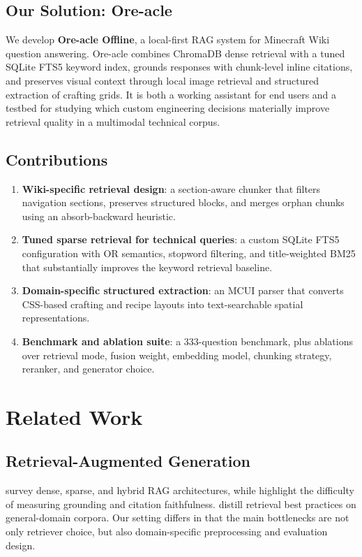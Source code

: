 \documentclass[11pt,a4paper]{article}
\begin{document}
\subsection{Our Solution: Ore-acle}
We develop \textbf{Ore-acle Offline}, a local-first RAG system for Minecraft Wiki question answering. Ore-acle combines ChromaDB dense retrieval with a tuned SQLite FTS5 keyword index, grounds responses with chunk-level inline citations, and preserves visual context through local image retrieval and structured extraction of crafting grids. It is both a working assistant for end users and a testbed for studying which custom engineering decisions materially improve retrieval quality in a multimodal technical corpus.

\subsection{Contributions}
\begin{enumerate}
    \item \textbf{Wiki-specific retrieval design}: a section-aware chunker that filters navigation sections, preserves structured blocks, and merges orphan chunks using an absorb-backward heuristic.
    \item \textbf{Tuned sparse retrieval for technical queries}: a custom SQLite FTS5 configuration with OR semantics, stopword filtering, and title-weighted BM25 that substantially improves the keyword retrieval baseline.
    \item \textbf{Domain-specific structured extraction}: an MCUI parser that converts CSS-based crafting and recipe layouts into text-searchable spatial representations.
    \item \textbf{Benchmark and ablation suite}: a 333-question benchmark, plus ablations over retrieval mode, fusion weight, embedding model, chunking strategy, reranker, and generator choice.
\end{enumerate}

\section{Related Work}

\subsection{Retrieval-Augmented Generation}
\citet{gao2023retrieval} survey dense, sparse, and hybrid RAG architectures, while \citet{yu2024evaluation} highlight the difficulty of measuring grounding and citation faithfulness. \citet{li2025enhancing} distill retrieval best practices on general-domain corpora. Our setting differs in that the main bottlenecks are not only retriever choice, but also domain-specific preprocessing and evaluation design.
\end{document}
